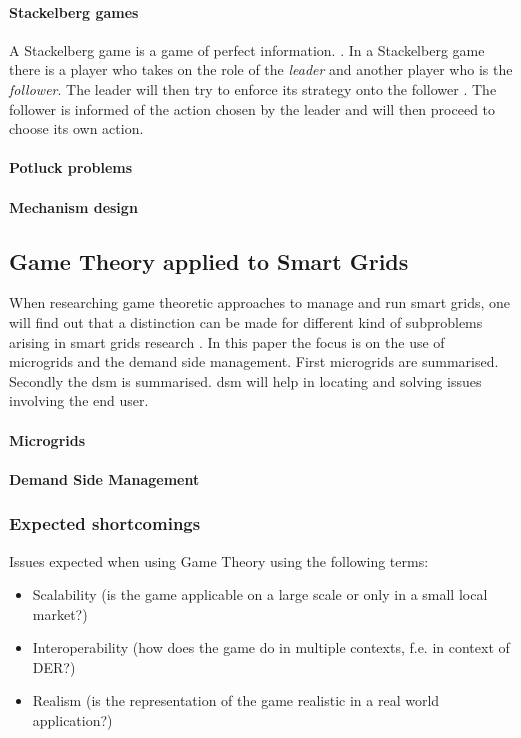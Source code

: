 \paragraph{Stackelberg games}
A Stackelberg game is a game of perfect information. \cite{CourseInGameTheory}.
In a Stackelberg game there is a player who takes on the role of the \textit{leader} and another player who is the \textit{follower}. The leader will then try to enforce its strategy onto the follower \cite{ShohamLeyton-Brown2008}. The follower is informed of the action chosen by the leader and will then proceed to choose its own action.

\paragraph{Potluck problems}

\paragraph{Mechanism design}


\subsection{Game Theory applied to Smart Grids}
When researching game theoretic approaches to manage and run smart grids, one will find out that a distinction can be made for different kind of subproblems arising in smart grids research \cite{keypaper}. In this paper the focus is on the use of microgrids and the demand side management. First microgrids are summarised. Secondly the \gls{dsm} is summarised. \gls{dsm} will help in locating and solving issues involving the end user. 

\paragraph{Microgrids}
\paragraph{Demand Side Management}


\subsubsection{Expected shortcomings}

Issues expected when using Game Theory using the following terms:
\begin{itemize}
	\item Scalability (is the game applicable on a large scale or only in a small local market?)
	\item Interoperability (how does the game do in multiple contexts, f.e. in context of DER?)
	\item Realism (is the representation of the game realistic in a real world application?)
\end{itemize}